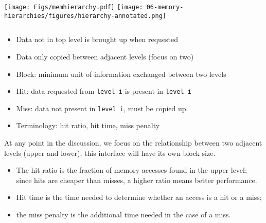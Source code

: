 \begin{frame}[fragile]

\begin{columns}
    \texttt{[image: Figs/memhierarchy.pdf]}
    \texttt{[image: 06-memory-hierarchies/figures/hierarchy-annotated.png]}
\end{columns}


\begin{itemize}
\item Data not in top level is brought up when requested
\item Data only copied between adjacent levels (focus on two)
\item Block: minimum unit of information exchanged between two levels 
\item Hit: data requested from {\tt level i} is present in {\tt level i}
\item Miss: data not present in {\tt level i}, must be copied up
\item Terminology: hit ratio, hit time, miss penalty
\end{itemize}
\BNotes\ifnum{}
At any point in the discussion, we focus on the relationship between
two adjacent levels (upper and lower); this interface will have its
own block size. 
\begin{itemize}
	\item The hit ratio is the fraction of memory accesses found
		in the upper level; since hits are cheaper than misses, a 
		higher ratio means better performance. 
	\item Hit time is the time needed to determine
		whether an access is a hit or a miss; 
	\item the miss penalty is the
		additional time needed in the case of a miss.
\end{itemize}
\fi\ENotes
\end{frame}


